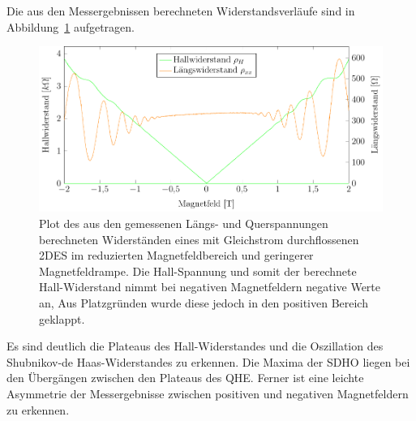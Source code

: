 Die aus den Messergebnissen berechneten Widerstandsverläufe sind in Abbildung~\ref{fig:2T_range_dc} aufgetragen.\\

\begin{figure}[h]
	\centering
	\includegraphics{graphs/dc/pm2T_range.pdf}
	\caption[Höher aufgelöste Gleichstrommessung in Magnetfeldteilbereich]{
		Plot des aus den gemessenen Längs- und Querspannungen berechneten Widerständen eines mit Gleichstrom durchflossenen 2DES im reduzierten Magnetfeldbereich und geringerer Magnetfeldrampe. Die Hall-Spannung und somit der berechnete Hall-Widerstand nimmt bei negativen Magnetfeldern negative Werte an, Aus Platzgründen wurde diese jedoch in den positiven Bereich geklappt.
	}
	\label{fig:2T_range_dc}
\end{figure}


Es sind deutlich die Plateaus des Hall-Widerstandes und die Oszillation des Shubnikov-de Haas-Widerstandes zu erkennen. Die Maxima der SDHO liegen bei den Übergängen zwischen den Plateaus des QHE. Ferner ist eine leichte Asymmetrie der Messergebnisse zwischen positiven und negativen Magnetfeldern zu erkennen. 